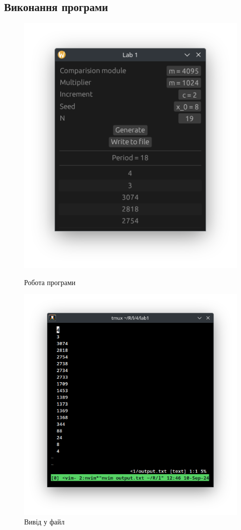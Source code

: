 \documentclass[oneside,14pt]{extarticle}
\begin{document}
\begin{normalsize}
	\subsection*{Виконання програми}
	\begin{figure}[H]
		\centering
		\begin{minipage}{0.45\textwidth}
			\centering
			\includegraphics[scale=0.8]{1}
			\caption{Робота програми}
		\end{minipage}
		\hfill
		\begin{minipage}{0.45\textwidth}
			\centering
			\includegraphics[scale=0.6]{2}
			\caption{Вивід у файл}
		\end{minipage}
	\end{figure}
	

\end{normalsize}
\end{document}
